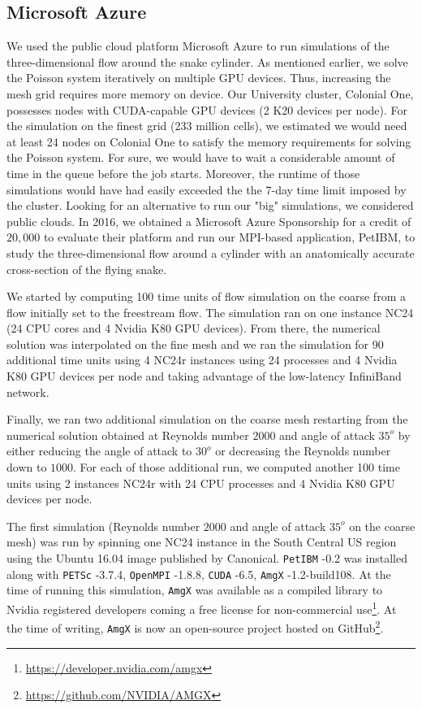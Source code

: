 \documentclass[12pt]{article}
\newcommand{\petibm}{\texttt{PetIBM} }
\newcommand{\petsc}{\texttt{PETSc} }
\newcommand{\cuda}{\texttt{CUDA} }
\newcommand{\amgx}{\texttt{AmgX} }
\newcommand{\openmpi}{\texttt{OpenMPI} }
\begin{document}
\subsection{Microsoft Azure}

We used the public cloud platform Microsoft Azure to run simulations of the three-dimensional flow around the snake cylinder.
As mentioned earlier, we solve the Poisson system iteratively on multiple GPU devices.
Thus, increasing the mesh grid requires more memory on device.
Our University cluster, Colonial One, possesses nodes with CUDA-capable GPU devices (2 K20 devices per node).
For the simulation on the finest grid (233 million cells), we estimated we would need at least 24 nodes on Colonial One to satisfy the memory requirements for solving the Poisson system.
For sure, we would have to wait a considerable amount of time in the queue before the job starts.
Moreover, the runtime of those simulations would have had easily exceeded the the 7-day time limit imposed by the cluster.
Looking for an alternative to run our "big" simulations, we considered public clouds.
In 2016, we obtained a Microsoft Azure Sponsorship for a credit of $20,000$ to evaluate their platform and run our MPI-based application, PetIBM, to study the three-dimensional flow around a cylinder with an anatomically accurate cross-section of the flying snake.

We started by computing 100 time units of flow simulation on the coarse from a flow initially set to the freestream flow.
The simulation ran on one instance NC24 (24 CPU cores and 4 Nvidia K80 GPU devices).
From there, the numerical solution was interpolated on the fine mesh and we ran the simulation for 90 additional time units using 4 NC24r instances using 24 processes and 4 Nvidia K80 GPU devices per node and taking advantage of the low-latency InfiniBand network.

Finally, we ran two additional simulation on the coarse mesh restarting from the numerical solution obtained at Reynolds number $2000$ and angle of attack $35^o$ by either reducing the angle of attack to $30^o$ or decreasing the Reynolds number down to $1000$.
For each of those additional run, we computed another 100 time units using 2 instances NC24r with 24 CPU processes and 4 Nvidia K80 GPU devices per node.

The first simulation (Reynolds number $2000$ and angle of attack $35^o$ on the coarse mesh) was run by spinning one NC24 instance in the South Central US region using the Ubuntu 16.04 image published by Canonical.
\petibm-0.2 was installed along with \petsc-3.7.4, \openmpi-1.8.8, \cuda-6.5, \amgx-1.2-build108.
At the time of running this simulation, \amgx was available as a compiled library to Nvidia registered developers coming a free license for non-commercial use\footnote{\url{https://developer.nvidia.com/amgx}}.
At the time of writing, \amgx is now an open-source project hosted on GitHub\footnote{\url{https://github.com/NVIDIA/AMGX}}.
\end{document}
